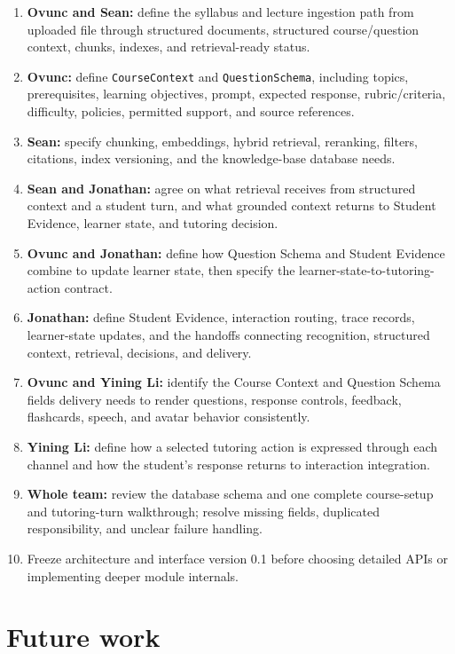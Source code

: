 \documentclass[11pt]{article}
\begin{document}
\begin{enumerate}
    \item \textbf{Ovunc and Sean:} define the syllabus and lecture ingestion path from uploaded file through structured documents, structured course/question context, chunks, indexes, and retrieval-ready status.
    \item \textbf{Ovunc:} define \texttt{CourseContext} and \texttt{QuestionSchema}, including topics, prerequisites, learning objectives, prompt, expected response, rubric/criteria, difficulty, policies, permitted support, and source references.
    \item \textbf{Sean:} specify chunking, embeddings, hybrid retrieval, reranking, filters, citations, index versioning, and the knowledge-base database needs.
    \item \textbf{Sean and Jonathan:} agree on what retrieval receives from structured context and a student turn, and what grounded context returns to Student Evidence, learner state, and tutoring decision.
    \item \textbf{Ovunc and Jonathan:} define how Question Schema and Student Evidence combine to update learner state, then specify the learner-state-to-tutoring-action contract.
    \item \textbf{Jonathan:} define Student Evidence, interaction routing, trace records, learner-state updates, and the handoffs connecting recognition, structured context, retrieval, decisions, and delivery.
    \item \textbf{Ovunc and Yining Li:} identify the Course Context and Question Schema fields delivery needs to render questions, response controls, feedback, flashcards, speech, and avatar behavior consistently.
    \item \textbf{Yining Li:} define how a selected tutoring action is expressed through each channel and how the student's response returns to interaction integration.
    \item \textbf{Whole team:} review the database schema and one complete course-setup and tutoring-turn walkthrough; resolve missing fields, duplicated responsibility, and unclear failure handling.
    \item Freeze architecture and interface version 0.1 before choosing detailed APIs or implementing deeper module internals.
\end{enumerate}

\section{Future work}
\end{document}
